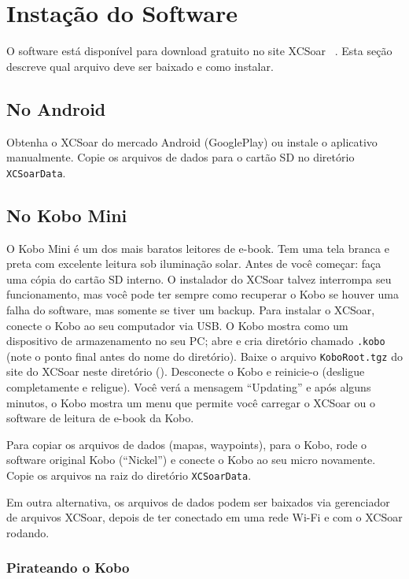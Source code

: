 \section{Instação do Software}

O software está disponível para download gratuito no site XCSoar    
~\xcsoarwebsite{}.  Esta seção descreve qual arquivo deve ser baixado e como instalar.

\subsection*{No Android}

Obtenha o XCSoar do mercado Android (GooglePlay) ou instale o aplicativo manualmente.  Copie os arquivos de dados para o cartão SD no diretório 
\verb|XCSoarData|.

\subsection*{No Kobo Mini}

O Kobo Mini é um dos mais baratos leitores de e-book.  Tem uma tela branca e preta com excelente leitura sob iluminação solar.  
Antes de você começar: faça uma cópia do cartão SD interno.  O instalador do XCSoar talvez interrompa seu funcionamento, mas você pode ter sempre como recuperar o Kobo se houver uma falha do software, mas somente se tiver um backup.
Para instalar o XCSoar, conecte o Kobo ao seu computador via USB. O Kobo mostra como um dispositivo de armazenamento no seu PC; abre e cria diretório chamado \texttt{.kobo} (note o ponto final antes do nome do diretório).  Baixe o arquivo \texttt{KoboRoot.tgz} do site do XCSoar neste diretório (). Desconecte o Kobo e reinicie-o (desligue completamente e religue).  Você verá a mensagem “Updating” e após alguns minutos, o Kobo mostra um menu que permite você carregar o XCSoar ou o software de leitura de e-book da Kobo.

Para copiar os arquivos de dados (mapas, waypoints), para o Kobo, rode o software original Kobo (“Nickel”) e conecte o Kobo ao seu micro novamente.  Copie os arquivos na raiz do diretório  \texttt{XCSoarData}.

Em outra alternativa, os arquivos de dados podem ser baixados via gerenciador de arquivos XCSoar, depois de ter conectado em uma rede Wi-Fi e com o XCSoar rodando.

\subsubsection{Pirateando o Kobo}


